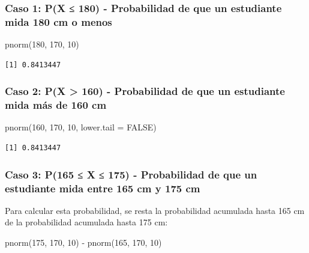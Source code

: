 \documentclass[
  spanish,
  letterpaper,
]{book}
\newenvironment{Shaded}{\begin{snugshade}}{\end{snugshade}}
\newcommand{\AttributeTok}[1]{\textcolor[rgb]{0.40,0.45,0.13}{#1}}
\newcommand{\ConstantTok}[1]{\textcolor[rgb]{0.56,0.35,0.01}{#1}}
\newcommand{\DecValTok}[1]{\textcolor[rgb]{0.68,0.00,0.00}{#1}}
\newcommand{\FunctionTok}[1]{\textcolor[rgb]{0.28,0.35,0.67}{#1}}
\newcommand{\NormalTok}[1]{\textcolor[rgb]{0.00,0.23,0.31}{#1}}
\newcommand{\SpecialCharTok}[1]{\textcolor[rgb]{0.37,0.37,0.37}{#1}}
\begin{document}
\subsubsection{Caso 1: P(X ≤ 180) - Probabilidad de que un estudiante
mida 180 cm o
menos}\label{caso-1-px-180---probabilidad-de-que-un-estudiante-mida-180-cm-o-menos}

\begin{Shaded}
\begin{Highlighting}[]
\FunctionTok{pnorm}\NormalTok{(}\DecValTok{180}\NormalTok{, }\DecValTok{170}\NormalTok{, }\DecValTok{10}\NormalTok{)}
\end{Highlighting}
\end{Shaded}

\begin{verbatim}
[1] 0.8413447
\end{verbatim}

\subsubsection{Caso 2: P(X \textgreater{} 160) - Probabilidad de que un
estudiante mida más de 160
cm}\label{caso-2-px-160---probabilidad-de-que-un-estudiante-mida-muxe1s-de-160-cm}

\begin{Shaded}
\begin{Highlighting}[]
\FunctionTok{pnorm}\NormalTok{(}\DecValTok{160}\NormalTok{, }\DecValTok{170}\NormalTok{, }\DecValTok{10}\NormalTok{, }\AttributeTok{lower.tail =} \ConstantTok{FALSE}\NormalTok{)}
\end{Highlighting}
\end{Shaded}

\begin{verbatim}
[1] 0.8413447
\end{verbatim}

\subsubsection{Caso 3: P(165 ≤ X ≤ 175) - Probabilidad de que un
estudiante mida entre 165 cm y 175
cm}\label{caso-3-p165-x-175---probabilidad-de-que-un-estudiante-mida-entre-165-cm-y-175-cm}

Para calcular esta probabilidad, se resta la probabilidad acumulada
hasta 165 cm de la probabilidad acumulada hasta 175 cm:

\begin{Shaded}
\begin{Highlighting}[]
\FunctionTok{pnorm}\NormalTok{(}\DecValTok{175}\NormalTok{, }\DecValTok{170}\NormalTok{, }\DecValTok{10}\NormalTok{) }\SpecialCharTok{{-}} \FunctionTok{pnorm}\NormalTok{(}\DecValTok{165}\NormalTok{, }\DecValTok{170}\NormalTok{, }\DecValTok{10}\NormalTok{)}
\end{Highlighting}
\end{Shaded}
\end{document}
